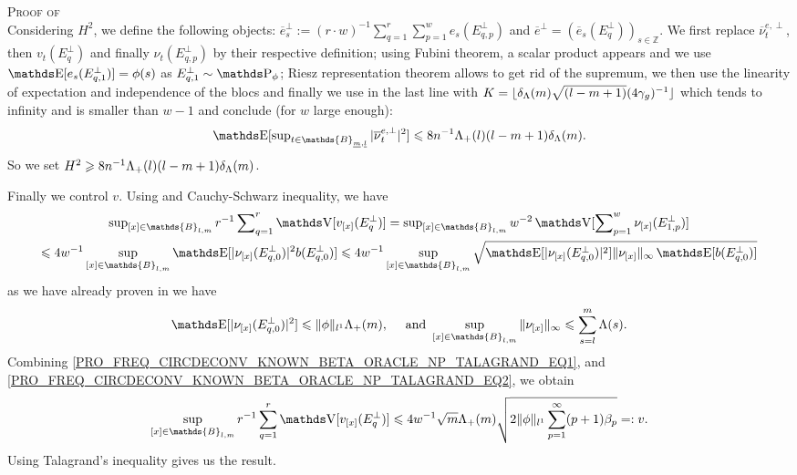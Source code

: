 \begin{pro}{\textsc{Proof of }\\}
Considering $H^{2}$, we define the following objects: $\overline{e}_{s}^{\perp} := (r \cdot w)^{-1} \sum\nolimits_{q = 1}^{r} \sum\nolimits_{p = 1}^{w} e_{s}(E^{\perp}_{q, p})$ and $\overline{e}^{\perp} = (\overline{e}_{s}(E_{q}^{\perp}))_{s \in \mathds{Z}}$.
We first replace $\overline{\nu}^{e, \perp}_{t}$, then $v_{t}(E^{\perp}_{q})$ and finally $\nu_{t}(E^{\perp}_{q, p})$ by their respective definition; using Fubini theorem, a scalar product appears and we use $\E[e_{s}(E^{\perp}_{q, 1})] = \phi(s)$ as $E^{\perp}_{q, 1} \sim \P_{\phi}$; Riesz representation theorem allows to get rid of the supremum, we then use the linearity of expectation and independence of the blocs and finally we use  in the last line with $K = \lfloor \delta_{\Lambda}(m) \sqrt{(l - m + 1)}(4 \gamma_{g})^{-1}\rfloor$ which tends to infinity and is smaller than $w - 1$ and conclude (for $w$ large enough):
\[\E[\sup\nolimits_{t \in \mathds{B}_{\underline{m}, \underline{l}}} \vert \overline{\nu}^{e, \perp}_{t}\vert^{2}] \leq 8 n^{-1} \Lambda_{+}(l) (l - m + 1) \cmiSv.\]
So we set $H^{2} \geqslant 8 n^{-1} \Lambda_{+}(l) (l - m + 1) \delta_{\Lambda}(m)$.

Finally we control $v$.
Using  and Cauchy-Schwarz inequality, we have
\begin{multline}\label{PRO_FREQ_CIRCDECONV_KNOWN_BETA_ORACLE_NP_TALAGRAND_EQ1}
\sup\nolimits_{[x] \in \mathds{B}_{l, m}}r^{-1} \sum\nolimits_{q = 1}^{r} \V[v_{[x]}(E_{q}^{\perp})] = \sup\nolimits_{[x] \in \mathds{B}_{l, m}} w^{-2} \V[\sum\nolimits_{p = 1}^{w} \nu_{[x]}(E_{1, p}^{\perp})]\\
\leq 4w^{-1} \sup_{[x] \in \mathds{B}_{l, m}} \E[\vert \nu_{[x]}(E_{q, 0}^{\perp}) \vert^{2} b(E_{q, 0}^{\perp})] \leq 4w^{-1} \sup_{[x] \in \mathds{B}_{l, m}} \sqrt{\E[\vert \nu_{[x]}(E_{q, 0}^{\perp}) \vert^{2}] \Vert \nu_{[x]} \Vert_{\infty} \E[b(E_{q, 0}^{\perp})]}
\end{multline}
as we have already proven in  we have
\begin{equation}\label{PRO_FREQ_CIRCDECONV_KNOWN_BETA_ORACLE_NP_TALAGRAND_EQ2}
\E[\vert \nu_{[x]}(E_{q, 0}^{\perp}) \vert^{2}] \leq \Vert \phi \Vert_{l^{1}} \Lambda_{+}(m), \quad \text{ and }\sup_{[x] \in \mathds{B}_{l, m}} \Vert \nu_{[x]} \Vert_{\infty} \leq \sum_{s = l}^{m}\Lambda(s).
\end{equation}
Combining \ref{PRO_FREQ_CIRCDECONV_KNOWN_BETA_ORACLE_NP_TALAGRAND_EQ1}, and \ref{PRO_FREQ_CIRCDECONV_KNOWN_BETA_ORACLE_NP_TALAGRAND_EQ2}, we obtain
\begin{multline*}
\sup_{[x] \in \mathds{B}_{l, m}}r^{-1} \sum_{q = 1}^{r} \V[v_{[x]}(E_{q}^{\perp})] \leq 4w^{-1} \sqrt{m} \Lambda_{+}(m) \sqrt{2 \Vert \phi \Vert_{l^{1}} \sum_{p = 1}^{\infty} (p + 1)\beta_{p}} =: v.\hfill
\end{multline*}
Using Talagrand's inequality gives us the result.
\proEnd
\end{pro}

